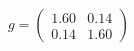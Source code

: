 \documentclass[preview]{standalone}
\begin{document}
\begin{align*}
g = \begin{pmatrix} 1.60 & 0.14 \\ 0.14 & 1.60 \end{pmatrix}
\end{align*}
\end{document}

